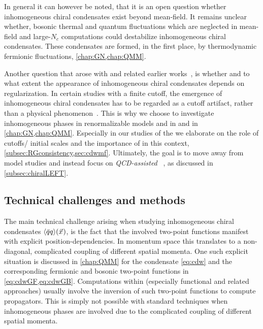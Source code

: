 In general it can however be noted, that it is an open question whether inhomogeneous chiral condensates exist beyond mean-field. 
It remains unclear whether, bosonic thermal and quantum fluctuations \dash{} which are neglected in mean-field and large-$N_c$ computations \dash{} could destabilize inhomogeneous chiral condensates.
These condensates are formed, in the first place, by thermodynamic fermionic fluctuations, \cf{} \cref{chap:GN,chap:QMM}.

Another question that arose with  and related earlier works~\cite{Broniowski:1990gb,Partyka:2008sv}, is whether and to 
what extent the appearance of inhomogeneous chiral condensates depends on regularization.
In certain studies with a finite cutoff, the emergence of inhomogeneous chiral condensates has to be regarded as a cutoff artifact, rather than a physical phenomenon~\cite{Buballa:2020nsi,Pannullo:2022eqh,Pannullo:2023one,Pannullo:2023nonint}.
This is why we choose to investigate inhomogeneous phases in renormalizable models \dash{} \gnm{} and \qmm{} \dash{} in \dtwo{} and \dfour{} in \cref{chap:GN,chap:QMM}.
Especially in our \mf{} studies of the \qmm{} we elaborate on the role of cutoffs/\uv{} initial scales and the importance of \rgcy{} in this context, \cf{} \cref{subsec:RGconsistency,sec:cdwmf}.
Ultimately, the goal is to move away from model studies and instead focus on \textit{QCD-assisted} \loefts{}~\cite{Fu:2019hdw, Leonhardt:2019mpy, Ihssen:2023xlp}, as discussed in \cref{subsec:chiralLEFT}.

\subsection{Technical challenges and methods}\label{subsec:inhomoMethods}
The main technical challenge arising when studying inhomogeneous chiral condensates $\langle \bar{q} q \rangle(\vec{x}\mskip1.0mu)$, is the fact that the involved two-point functions manifest with explicit position-dependencies. In momentum space this translates to a non-diagonal, complicated coupling of different spatial momenta.
One such explicit situation is discussed in \cref{chap:QMM} for the \cdw{} condensate \eqref{eq:cdw} and the corresponding fermionic and bosonic two-point functions in \cref{eq:cdwGF,eq:cdwGB}.
Computations within \qft{} (especially functional and related approaches) usually involve the inversion of such two-point functions to compute propagators.
This is simply not possible with standard techniques when inhomogeneous phases are involved due to the complicated coupling of different spatial momenta.\bigskip


